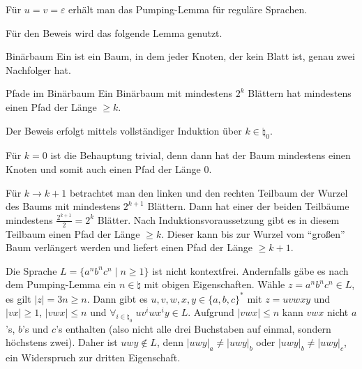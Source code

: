 \begin{Bem}
    Für $u = v = \varepsilon$ erhält man das Pumping-Lemma für
    reguläre Sprachen.
\end{Bem}

\linie
\pagebreak

\begin{Bem}
    Für den Beweis wird das folgende Lemma genutzt.
\end{Bem}

\begin{Def}{Binärbaum}
    Ein  ist ein Baum, in dem jeder Knoten,
    der kein Blatt ist, genau zwei Nachfolger hat.
\end{Def}

\begin{Lemma}{Pfade im Binärbaum}
    Ein Binärbaum mit mindestens $2^k$ Blättern hat mindestens einen Pfad der
    Länge $\ge k$.
\end{Lemma}

\begin{Beweis}
    Der Beweis erfolgt mittels vollständiger Induktion
    über $k \in \natural_0$.

    Für $k = 0$ ist die Behauptung trivial, denn dann hat der Baum mindestens
    einen Knoten und somit auch einen Pfad der Länge $0$.

    Für $k \to k + 1$ betrachtet man den linken und den rechten Teilbaum der
    Wurzel des Baums mit mindestens $2^{k+1}$ Blättern.
    Dann hat einer der beiden Teilbäume mindestens $\frac{2^{k+1}}{2} = 2^k$
    Blätter.
    Nach Induktionsvoraussetzung gibt es in diesem Teilbaum einen Pfad der
    Länge $\ge k$.
    Dieser kann bis zur Wurzel vom "`großen"' Baum verlängert werden und
    liefert einen Pfad der Länge $\ge k + 1$.
\end{Beweis}

\linie

\begin{Bsp}
    Die Sprache $L = \{a^n b^n c^n \;|\; n \ge 1\}$ ist nicht kontextfrei.
    Andernfalls gäbe es nach dem Pumping-Lemma ein $n \in \natural$ mit
    obigen Eigenschaften.
    Wähle $z = a^n b^n c^n \in L$,
    es gilt $|z| = 3n \ge n$.
    Dann gibt es $u, v, w, x, y \in \{a, b, c\}^\ast$ mit $z = uvwxy$ und
    $|vx| \ge 1$, $|vwx| \le n$ und
    $\forall_{i \in \natural_0}\; uv^iwx^iy \in L$.
    Aufgrund $|vwx| \le n$ kann $vwx$ nicht $a$'s, $b$'s und $c$'s enthalten
    (also nicht alle drei Buchstaben auf einmal, sondern höchstens zwei).
    Daher ist $uwy \notin L$, denn
    $|uwy|_a \not= |uwy|_b$ oder
    $|uwy|_b \not= |uwy|_c$, ein Widerspruch zur dritten Eigenschaft.
\end{Bsp}

